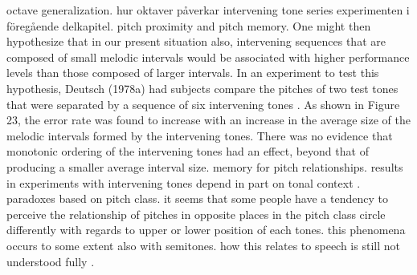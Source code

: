 octave generalization. hur oktaver påverkar intervening tone series experimenten i föregående delkapitel.
pitch proximity and pitch memory. One might then hypothesize that in our present situation also, intervening sequences that are composed of small melodic intervals would be associated with higher performance levels than those composed of larger intervals. In an experiment to test this hypothesis, Deutsch (1978a) had subjects compare the pitches of two test tones that were separated by a sequence of six intervening tones \cite{deutsch1978delayed}. As shown in Figure 23, the error rate was found to increase with an increase in the average size of the melodic intervals formed by the intervening tones. There was no evidence that monotonic ordering of the intervening tones had an effect, beyond that of producing a smaller average interval size.
memory for pitch relationships. results in experiments with intervening tones depend in part on tonal context \cite{deutsch1974error}.
paradoxes based on pitch class. it seems that some people have a tendency to perceive the relationship of pitches in opposite places in the pitch class circle differently with regards to upper or lower position of each tones. this phenomena occurs to some extent also with semitones. how this relates to speech is still not understood fully \cite{deutsch2013psychology}.

